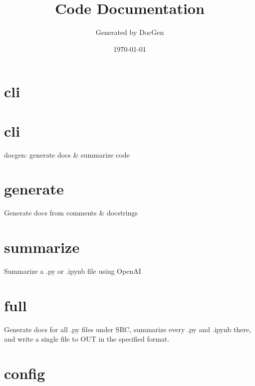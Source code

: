 \documentclass{article}
\title{Code Documentation}
\author{Generated by DocGen}
\date{\today}
\begin{document}
\maketitle
\tableofcontents


\section{cli}








\section{cli}


docgen: generate docs & summarize code







\section{generate}


Generate docs from comments & docstrings







\section{summarize}


Summarize a .py or .ipynb file using OpenAI







\section{full}


Generate docs for all .py files under SRC, summarize every .py and .ipynb there,
and write a single file to OUT in the specified format.







\section{config}
\end{document}
